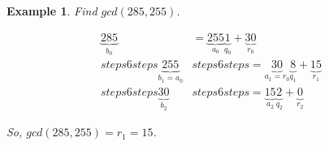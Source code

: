 \documentclass[a4paper,12pt]{report}
\newcommand{\class}{}
\newcounter{statement}
\numberwithin{statement}{chapter}
\newtheorem{eg}[statement]{\bf Example}
\numberwithin{equation}{chapter}
\numberwithin{section}{chapter}
\numberwithin{subsection}{section}
\begin{document}
\begin{eg}
Find $gcd(285,255)$.





\[
\begin{split}
\underbrace{285}_{b_0} &= \underbrace{255}_{a_0} \underbrace{1}_{q_0} + \underbrace{30}_{r_0}
\\
\class{steps6 steps}{
\underbrace{255}_{b_1 = a_0}
}
&
\class{steps6 steps}{=\underbrace{30}_{a_1 = r_0} \underbrace{8}_{q_1} + \underbrace{15}_{r_1}}
\\
\class{steps6 steps}{\underbrace{30}_{b_2}} 
&
\class{steps6 steps}{=\underbrace{15}_{a_2} \underbrace{2}_{q_2} + \underbrace{0}_{r_2}}
\end{split}
\]


So, $gcd(285, 255) = r_1 = 15$.

\end{eg}
\end{document}
